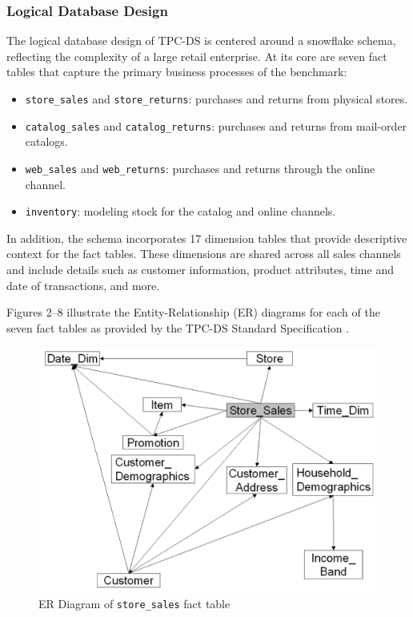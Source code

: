 \documentclass[conference]{IEEEtran}
\begin{document}
\subsubsection{Logical Database Design}

The logical database design of TPC-DS is centered around a snowflake schema, reflecting the complexity of a large retail enterprise. At its core are seven fact tables that capture the primary business processes of the benchmark:
\begin{itemize}
    \item \texttt{store\_sales} and \texttt{store\_returns}: purchases and returns from physical stores.
    \item \texttt{catalog\_sales} and \texttt{catalog\_returns}: purchases and returns from mail-order catalogs.
    \item \texttt{web\_sales} and \texttt{web\_returns}: purchases and returns through the online channel.
    \item \texttt{inventory}: modeling stock for the catalog and online channels.
\end{itemize}

In addition, the schema incorporates 17 dimension tables that provide descriptive context for the fact tables. These dimensions are shared across all sales channels and include details such as customer information, product attributes, time and date of transactions, and more.

Figures 2--8 illustrate the Entity-Relationship (ER) diagrams for each of the seven fact tables as provided by the TPC-DS Standard Specification \cite{b5}.

\begin{figure}[htbp]
    \centering
    \includegraphics[width=\linewidth]{figures/fact_table_store_sales.png}
    \caption{ER Diagram of \texttt{store\_sales} fact table }
    \label{fig:store_sales}
\end{figure}
\end{document}
